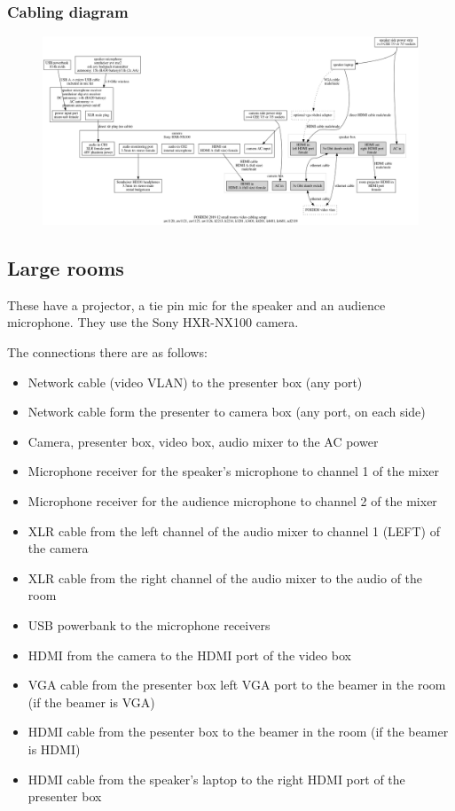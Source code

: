 \documentclass{article}
\begin{document}
\subsubsection{Cabling diagram}
\begin{figure}[H]
  \begin{sideways}
  \centering
  \includegraphics[width = 200mm]{../../graph/cabling_small_rooms.png}
  \end{sideways}
\end{figure}

\subsection{Large rooms}
These have a projector, a tie pin mic for the speaker and an audience microphone. They use the Sony HXR-NX100 camera. 

The connections there are as follows:

\begin{itemize}
  \item Network cable (video VLAN) to the presenter box (any port)
  \item Network cable form the presenter to camera box (any port, on each side)
  \item Camera, presenter box, video box, audio mixer to the AC power
  \item Microphone receiver for the speaker's microphone to channel 1 of the mixer
  \item Microphone receiver for the audience microphone to channel 2 of the mixer
  \item XLR cable from the left channel of the audio mixer to channel 1 (LEFT) of the camera
  \item XLR cable from the right channel of the audio mixer to the audio of the room
  \item USB powerbank to the microphone receivers
  \item HDMI from the camera to the HDMI port of the video box
  \item VGA cable from the presenter box left VGA port to the beamer in the room (if the beamer is VGA)
  \item HDMI cable from the pesenter box to the beamer in the room (if the beamer is HDMI)
  \item HDMI cable from the speaker's laptop to the right HDMI port of the presenter box
\end{itemize}
\end{document}
